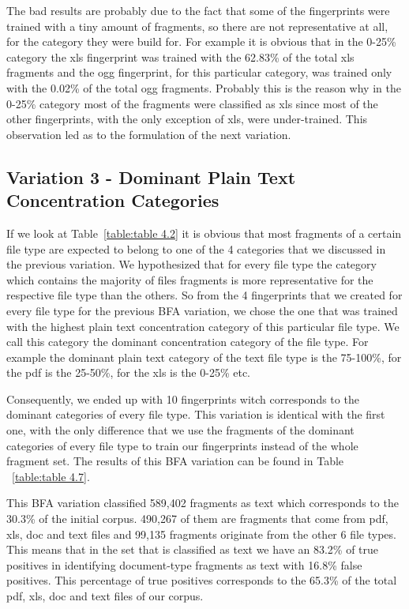  The bad results are probably due to the fact that some of the fingerprints were trained with a tiny amount of fragments, so there are not representative at all, for the category they were build for. For example it is obvious that in the 0-25\% category the xls fingerprint was trained with the 62.83\% of the total xls fragments and the ogg fingerprint, for this particular category, was trained only with the 0.02\% of the total ogg fragments. Probably this is the reason why in the 0-25\% category most of the fragments were classified as xls since most of the other fingerprints, with the only exception of xls, were under-trained. This observation led as to the formulation of the next variation.




\subsection{Variation 3 - Dominant Plain Text Concentration Categories}

If we look at Table~\ref{table:table 4.2} it is obvious that most fragments of a certain file type are expected to belong to one of the 4 categories that we discussed in the previous variation. We hypothesized that for every file type the category which contains the majority of files  fragments is more representative for the respective file type than the others. So from the 4 fingerprints that we created for every file type for the previous BFA variation, we chose the one that was trained with the highest plain text concentration category of this particular file type. We call this category the dominant concentration category of the file type. For example the dominant plain text category of the text file type is the 75-100\%, for the pdf is the 25-50\%, for the xls is the 0-25\% etc. 

Consequently, we ended up with 10 fingerprints witch corresponds to the dominant categories of every file type. This variation is identical with the first one, with the only difference that we use the fragments of the dominant categories of every file type to train our fingerprints instead of the whole fragment set. The results of this BFA variation can be found in Table ~\ref{table:table 4.7}.

This BFA variation classified 589,402 fragments as text which corresponds to the 30.3\% of the initial corpus. 490,267 of them are fragments that come from pdf, xls, doc and text files and 99,135 fragments originate from the other 6 file types. This means that in the set that is classified as text we have an 83.2\% of true positives in identifying document-type fragments as text with 16.8\% false positives. This percentage of true positives corresponds to the 65.3\% of the total pdf, xls, doc and text files of our corpus.

